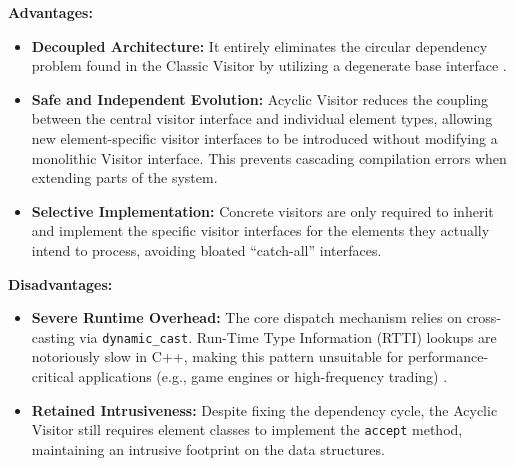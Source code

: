\textbf{Advantages:}
\begin{itemize}
    \item \textbf{Decoupled Architecture:} It entirely eliminates the circular dependency problem found in the Classic Visitor by utilizing a degenerate base interface \cite{martin1997}.
    \item \textbf{Safe and Independent Evolution:} Acyclic Visitor reduces the coupling between the central visitor interface and individual element types, allowing new element-specific visitor interfaces to be introduced without modifying a monolithic Visitor interface. This prevents cascading compilation errors when extending parts of the system.
    \item \textbf{Selective Implementation:} Concrete visitors are only required to inherit and implement the specific visitor interfaces for the elements they actually intend to process, avoiding bloated ``catch-all'' interfaces.
\end{itemize}

\textbf{Disadvantages:}
\begin{itemize}
    \item \textbf{Severe Runtime Overhead:} The core dispatch mechanism relies on cross-casting via \texttt{dynamic\_cast}. Run-Time Type Information (RTTI) lookups are notoriously slow in C++, making this pattern unsuitable for performance-critical applications (e.g., game engines or high-frequency trading) \cite{cpprefrtti}.
    \item \textbf{Retained Intrusiveness:} Despite fixing the dependency cycle, the Acyclic Visitor still requires element classes to implement the \texttt{accept} method, maintaining an intrusive footprint on the data structures.
\end{itemize}
